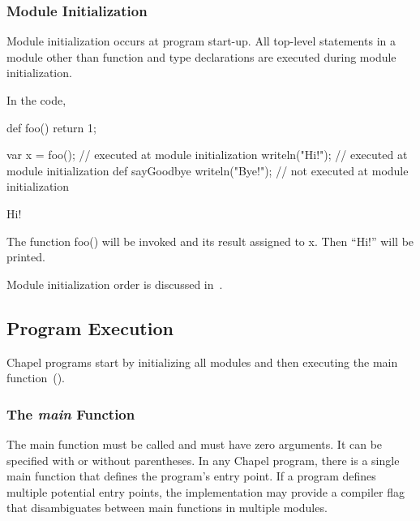 \subsubsection{Module Initialization}
\label{Module_Initialization}

Module initialization occurs at program start-up.  All top-level
statements in a module other than function and type declarations are
executed during module initialization.

\begin{example}
In the code,
\begin{chapelpre}
def foo() {
    return 1;
}
\end{chapelpre}
\begin{chapel}
var x = foo();       // executed at module initialization
writeln("Hi!");      // executed at module initialization
def sayGoodbye {
  writeln("Bye!");   // not executed at module initialization
}
\end{chapel}
\begin{chapeloutput}
Hi!
\end{chapeloutput}
The function foo() will be invoked and its result assigned to x.  Then
``Hi!'' will be printed.
\end{example}

Module initialization order is discussed
in~.



\subsection{Program Execution}
\label{Program_Execution}

Chapel programs start by initializing all modules and then executing
the main function~().

\subsubsection{The {\em main} Function}
\label{The_main_Function}

The main function must be called  and must have zero
arguments.  It can be specified with or without parentheses.  In any
Chapel program, there is a single main function that defines the
program's entry point.  If a program defines multiple potential entry
points, the implementation may provide a compiler flag that
disambiguates between main functions in multiple modules.

